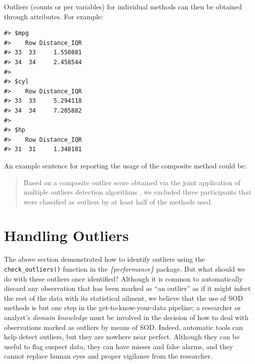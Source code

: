 \documentclass[mathematics,article,submit,moreauthors,pdftex]{mdpi}
\newenvironment{Shaded}{\begin{snugshade}}{\end{snugshade}}
\newcommand{\FunctionTok}[1]{\textcolor[rgb]{0.00,0.00,0.00}{#1}}
\newcommand{\NormalTok}[1]{#1}
\newcommand{\SpecialCharTok}[1]{\textcolor[rgb]{0.00,0.00,0.00}{#1}}
\begin{document}
Outliers (counts or per variables) for individual methods can then be
obtained through attributes. For example:

\begin{Shaded}
\end{Shaded}

\begin{verbatim}
#> $mpg
#>    Row Distance_IQR
#> 33  33     1.550881
#> 34  34     2.458544
#> 
#> $cyl
#>    Row Distance_IQR
#> 33  33     5.294118
#> 34  34     7.205882
#> 
#> $hp
#>    Row Distance_IQR
#> 31  31     1.348181
\end{verbatim}

An example sentence for reporting the usage of the composite method
could be:

\begin{quote}
Based on a composite outlier score \citep[see the `check\_outliers'
function in the `performance' R package,][]{ludecke2021performance}
obtained via the joint application of multiple outliers detection
algorithms \citetext{\citealp[(a) median absolute deviation (MAD)-based
robust \emph{z} scores,][]{leys2013outliers}; \citealp[(b) interquartile
range (IQR), (c) Mahalanobis minimum covariance determinant
(MCD),][]{leys2019outliers}; \citealp[and (d) invariant coordinate
selection (ICS),][]{archimbaud2018ics}}, we excluded three participants
that were classified as outliers by at least half of the methods used.
\end{quote}

\hypertarget{handling-outliers}{%
\section{Handling Outliers}\label{handling-outliers}}

The above section demonstrated how to identify outliers using the
\texttt{check\_outliers()} function in the \emph{\{performance\}}
package. But what should we do with these outliers once identified?
Although it is common to automatically discard any observation that has
been marked as ``an outlier'' as if it might infect the rest of the data
with its statistical ailment, we believe that the use of SOD methods is
but one step in the get-to-know-your-data pipeline; a researcher or
analyst's \emph{domain knowledge} must be involved in the decision of
how to deal with observations marked as outliers by means of SOD.
Indeed, automatic tools can help detect outliers, but they are nowhere
near perfect. Although they can be useful to flag suspect data, they can
have misses and false alarms, and they cannot replace human eyes and
proper vigilance from the researcher.
\end{document}
